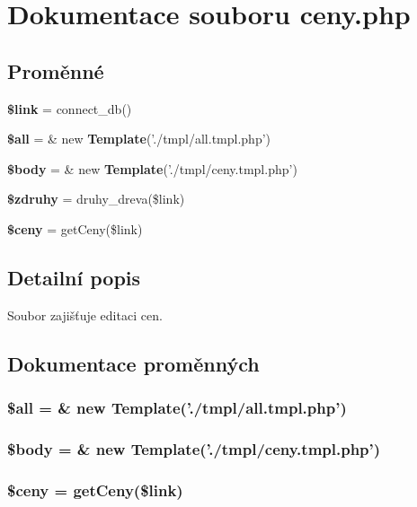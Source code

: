 \section{Dokumentace souboru ceny.php}
\label{ceny_8php}
\subsection*{Proměnné}
\begin{CompactItemize}
\item 
{\bf \$link} = connect\_\-db()
\item 
{\bf \$all} = \& new {\bf Template}('./tmpl/all.tmpl.php')
\item 
{\bf \$body} = \& new {\bf Template}('./tmpl/ceny.tmpl.php')
\item 
{\bf \$zdruhy} = druhy\_\-dreva(\$link)
\item 
{\bf \$ceny} = getCeny(\$link)
\end{CompactItemize}


\subsection{Detailní popis}
Soubor zajišťuje editaci cen. 

\subsection{Dokumentace proměnných}
\subsubsection{\setlength{\rightskip}{0pt plus 5cm}\$all = \& new {\bf Template}('./tmpl/all.tmpl.php')}\label{ceny_8php_3c74ea9d2348c9aba28d36e692bef2d2}


\subsubsection{\setlength{\rightskip}{0pt plus 5cm}\$body = \& new {\bf Template}('./tmpl/ceny.tmpl.php')}\label{ceny_8php_26b9f9373f7bb79dfcf8a86dff086b45}


\subsubsection{\setlength{\rightskip}{0pt plus 5cm}\$ceny = getCeny(\$link)}\label{ceny_8php_22c2c5c2c686d4be1f43b067588d790a}


